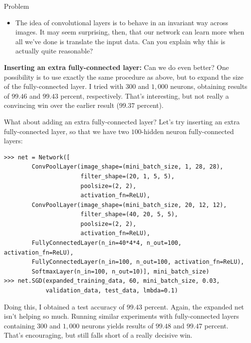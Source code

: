 \begin{exerciseBox}{Problem}


\begin{itemize}

\item The idea of convolutional layers is to behave in an invariant way across images. It may seem surprising, then, that our network can learn more when all we've done is translate the input data. Can you explain why this is actually quite reasonable?

\end{itemize}


\textbf{Inserting an extra fully-connected layer:} Can we do even better? One possibility is to use exactly the same procedure as above, but to expand the size of the fully-connected layer. I tried with $300$ and $1,000$ neurons, obtaining results of $99.46$ and $99.43$ percent, respectively. That's interesting, but not really a convincing win over the earlier result ($99.37$ percent).


What about adding an extra fully-connected layer? Let's try inserting an extra fully-connected layer, so that we have two $100$-hidden neuron fully-connected layers:



\begin{lstlisting}
>>> net = Network([
        ConvPoolLayer(image_shape=(mini_batch_size, 1, 28, 28), 
                      filter_shape=(20, 1, 5, 5), 
                      poolsize=(2, 2), 
                      activation_fn=ReLU),
        ConvPoolLayer(image_shape=(mini_batch_size, 20, 12, 12), 
                      filter_shape=(40, 20, 5, 5), 
                      poolsize=(2, 2), 
                      activation_fn=ReLU),
        FullyConnectedLayer(n_in=40*4*4, n_out=100, activation_fn=ReLU),
        FullyConnectedLayer(n_in=100, n_out=100, activation_fn=ReLU),
        SoftmaxLayer(n_in=100, n_out=10)], mini_batch_size)
>>> net.SGD(expanded_training_data, 60, mini_batch_size, 0.03, 
            validation_data, test_data, lmbda=0.1)

\end{lstlisting}


Doing this, I obtained a test accuracy of $99.43$ percent. Again, the expanded net isn't helping so much. Running similar experiments with fully-connected layers containing $300$ and $1,000$ neurons yields results of $99.48$ and $99.47$ percent. That's encouraging, but still falls short of a really decisive win.



\end{exerciseBox}
